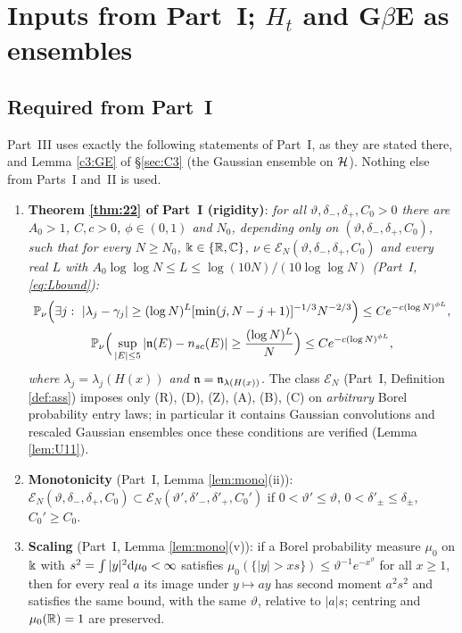 \section{Inputs from Part~I; $H_t$ and G$\beta$E as ensembles}\label{sec:C2}

\subsection{Required from Part~I}\label{sec:reqA}

Part~III uses exactly the following statements of Part~I, as they are stated there, and Lemma \ref{c3:GE} of \S\ref{sec:C3} (the Gaussian ensemble on $\mathcal{H}$). Nothing else from Parts~I and~II is used.

\begin{enumerate}[leftmargin=2.4em,itemsep=2pt,label=(RA\arabic*)]
\item \textbf{Theorem \ref{thm:22} of Part~I (rigidity)}: \emph{for all $\vartheta,\delta_-,\delta_+,C_0>0$ there are $A_0>1$, $C,c>0$, $\phi\in(0,1)$ and $N_0$, depending only on $(\vartheta,\delta_-,\delta_+,C_0)$, such that for every $N\ge N_0$, $\Bbbk\in\{\mathbb{R},\mathbb{C}\}$, $\nu\in\mathcal E_N(\vartheta,\delta_-,\delta_+,C_0)$ and every real $L$ with $A_0\log\log N\le L\le\log(10N)/(10\log\log N)$ \textup{(}Part~I, \eqref{eq:Lbound}\textup{)}:}
\begin{gather*}
\mathbb{P}_\nu\Big(\exists j:\ |\lambda_j-\gamma_j|\ge(\log N)^L[\min(j,N-j+1)]^{-1/3}N^{-2/3}\Big)\le Ce^{-c(\log N)^{\phi L}},\\
\mathbb{P}_\nu\Big(\sup_{|E|\le5}|\mathfrak{n}(E)-n_{sc}(E)|\ge\frac{(\log N)^L}{N}\Big)\le Ce^{-c(\log N)^{\phi L}},
\end{gather*}
\emph{where $\lambda_j=\lambda_j(H(x))$ and $\mathfrak{n}=\mathfrak{n}_{\lambda(H(x))}$.} The class $\mathcal E_N$ (Part~I, Definition \ref{def:ass}) imposes only (R), (D), (Z), (A), (B), (C) on \emph{arbitrary} Borel probability entry laws; in particular it contains Gaussian convolutions and rescaled Gaussian ensembles once these conditions are verified (Lemma \ref{lem:U11}).
\item \textbf{Monotonicity} (Part~I, Lemma \ref{lem:mono}(ii)): $\mathcal E_N(\vartheta,\delta_-,\delta_+,C_0)\subset\mathcal E_N(\vartheta',\delta'_-,\delta'_+,C_0')$ if $0<\vartheta'\le\vartheta$, $0<\delta'_\pm\le\delta_\pm$, $C_0'\ge C_0$.
\item \textbf{Scaling} (Part~I, Lemma \ref{lem:mono}(v)): if a Borel probability measure $\mu_0$ on $\Bbbk$ with $s^2=\int|y|^2\mathrm{d}\mu_0<\infty$ satisfies $\mu_0(\{|y|>xs\})\le\vartheta^{-1}e^{-x^\vartheta}$ for all $x\ge1$, then for every real $a$ its image under $y\mapsto ay$ has second moment $a^2s^2$ and satisfies the same bound, with the same $\vartheta$, relative to $|a|s$; centring and $\mu_0(\mathbb{R})=1$ are preserved.

\end{enumerate}
